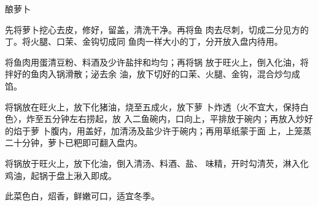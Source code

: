 \begin{recipe}{酿萝卜}

\ingredients



\cooking

\step 先将萝卜挖心去皮，修好，留盖，清洗干净。再将鱼 肉去尽刺，切成二分见方的丁。将火腿、口茉、金钩切成同 鱼肉一样大小的丁，分开放入盘内待用。

\step 将鱼肉用蛋清豆粉、料酒及少许盐拌和均匀；再将锅 放于旺火上，倒入化油，将拌好的鱼肉入锅滑散；泌去余 油，放下切好的口茉、火腿、金钩，混合炒匀成馅。

\step 将锅放在旺火上，放下化猪油，烧至五成火，放下萝 卜炸透（火不宜大，保持白色〉，炸至五分钟左右捞起，放 入二鱼碗内，口向上，平排放于碗内；再放入炒好的焰于萝 卜腹内，用盖好，加清汤及盐少许于碗内；再用草纸蒙于面 上，上笼蒸二十分钟，萝卜已粑即可翻入盘内。

\step 将锅放于旺火上，放下化油，倒入清汤、料酒、盐、 味精，开时勾清芡，淋入化鸡油，起锅于盘上湫入即成。

\notes

此菜色白，炤香，鲜嫩可口，适宜冬季。

\end{recipe}

